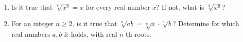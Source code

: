 \begin{enumerate}
\item[(a)] Is it true that $\sqrt[8]{x^8}=x$ for every real number $x$? If not, what is $\sqrt[8]{x^8}$?
\item[(b)] For an integer $n\ge2$, is it true that $\sqrt[n]{ab}=\sqrt[n]a\cdot\sqrt[n]b$? Determine for which real numbers $a,b$ it holds, with real $n$-th roots.
\end{enumerate}
